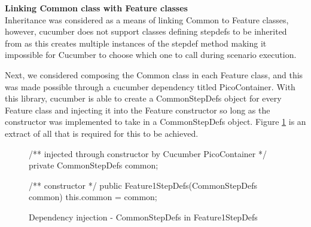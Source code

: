 \par
\textbf{Linking Common class with Feature classes\\}
Inheritance was considered as a means of linking Common to Feature classes, however, cucumber does not support classes defining stepdefs to be inherited from as this creates multiple instances of the stepdef method making it impossible for Cucumber to choose which one to call during scenario execution. 
\par 
Next, we considered composing the Common class in each Feature class, and this was made possible through a cucumber dependency titled PicoContainer. With this library, cucumber is able to create a CommonStepDefs object for every Feature class and injecting it into the Feature constructor so long as the constructor was implemented to take in a CommonStepDefs object. Figure \ref{code:cucumber-piccontainer-di} is an extract of all that is required for this to be achieved.

\begin{figure}[H]
\begin{javacode}
/** injected through constructor by Cucumber PicoContainer */
private CommonStepDefs common;

/** constructor */ 
public Feature1StepDefs(CommonStepDefs common) {
    this.common = common;
}
\end{javacode}
\caption{Dependency injection - CommonStepDefs in Feature1StepDefs}    
\label{code:cucumber-piccontainer-di}
\end{figure}
 
